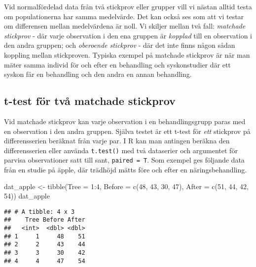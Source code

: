 \documentclass[
]{book}
\newenvironment{Shaded}{\begin{snugshade}}{\end{snugshade}}
\newcommand{\AttributeTok}[1]{\textcolor[rgb]{0.77,0.63,0.00}{#1}}
\newcommand{\DecValTok}[1]{\textcolor[rgb]{0.00,0.00,0.81}{#1}}
\newcommand{\FunctionTok}[1]{\textcolor[rgb]{0.00,0.00,0.00}{#1}}
\newcommand{\NormalTok}[1]{#1}
\newcommand{\OtherTok}[1]{\textcolor[rgb]{0.56,0.35,0.01}{#1}}
\newcommand{\SpecialCharTok}[1]{\textcolor[rgb]{0.00,0.00,0.00}{#1}}
\theoremstyle{definition}
\theoremstyle{definition}
\theoremstyle{definition}
\theoremstyle{definition}
\theoremstyle{remark}
\begin{document}
Vid normalfördelad data från två stickprov eller grupper vill vi nästan alltid testa om populationerna har samma medelvärde. Det kan också ses som att vi testar om differensen mellan medelvärdena är noll. Vi skiljer mellan två fall: \emph{matchade stickprov} - där varje observation i den ena gruppen är \emph{kopplad} till en observation i den andra gruppen; och \emph{oberoende stickprov} - där det inte finns någon sådan koppling mellan stickproven. Typiska exempel på matchade stickprov är när man mäter samma individ för och efter en behandling och syskonstudier där ett syskon får en behandling och den andra en annan behandling.

\hypertarget{t-test-fuxf6r-tvuxe5-matchade-stickprov}{%
\subsection{t-test för två matchade stickprov}\label{t-test-fuxf6r-tvuxe5-matchade-stickprov}}

Vid matchade stickprov kan varje observation i en behandlingsgrupp paras med en observation i den andra gruppen. Själva testet är ett t-test för \emph{ett} stickprov på differensserien beräknat från varje par. I R kan man antingen beräkna den differensserien eller använda \texttt{t.test()} med två dataserier och argumentet för parvisa observationer satt till sant, \texttt{paired\ =\ T}.
Som exempel ges följande data från en studie på äpple, där trädhöjd mätts före och efter en näringsbehandling.

\begin{Shaded}
\begin{Highlighting}[]
\NormalTok{dat\_apple }\OtherTok{\textless{}{-}} \FunctionTok{tibble}\NormalTok{(}\AttributeTok{Tree =} \DecValTok{1}\SpecialCharTok{:}\DecValTok{4}\NormalTok{, }
              \AttributeTok{Before =} \FunctionTok{c}\NormalTok{(}\DecValTok{48}\NormalTok{, }\DecValTok{43}\NormalTok{, }\DecValTok{30}\NormalTok{, }\DecValTok{47}\NormalTok{), }
              \AttributeTok{After =} \FunctionTok{c}\NormalTok{(}\DecValTok{51}\NormalTok{, }\DecValTok{44}\NormalTok{, }\DecValTok{42}\NormalTok{, }\DecValTok{54}\NormalTok{))}
\NormalTok{dat\_apple}
\end{Highlighting}
\end{Shaded}

\begin{verbatim}
## # A tibble: 4 x 3
##    Tree Before After
##   <int>  <dbl> <dbl>
## 1     1     48    51
## 2     2     43    44
## 3     3     30    42
## 4     4     47    54
\end{verbatim}
\end{document}
